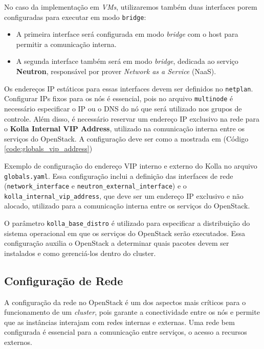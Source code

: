 No caso da implementação em \textit{VMs}, utilizaremos também duas interfaces porem configuradas para executar em modo \texttt{bridge}:
\begin{itemize}
    \item A primeira interface será configurada em modo \textit{bridge} com o host para permitir a comunicação interna.
    \item A segunda interface também será em modo \textit{bridge}, dedicada ao serviço \textbf{Neutron}, responsável por prover \textit{Network as a Service} (NaaS).
\end{itemize}

Os endereços IP estáticos para essas interfaces devem ser definidos no \texttt{netplan}. Configurar IPs fixos para os nós é essencial, pois no arquivo \texttt{multinode} é necessário especificar o IP ou o DNS do nó que será utilizado nos grupos de controle. Além disso, é necessário reservar um endereço IP exclusivo na rede para o \textbf{Kolla Internal VIP Address}, utilizado na comunicação interna entre os serviços do OpenStack. A configuração deve ser como a mostrada em (Código \ref{code:globals_vip_address})

\begin{listing}[h!]
    \noindent{}  
  \caption{Exemplo de configuração do endereço VIP interno e externo do Kolla no arquivo \texttt{globals.yaml}. Essa configuração inclui a definição das interfaces de rede (\texttt{network\_interface} e \texttt{neutron\_external\_interface}) e o \texttt{kolla\_internal\_vip\_address}, que deve ser um endereço IP exclusivo e não alocado, utilizado para a comunicação interna entre os serviços do OpenStack.}
  \label{code:globals_vip_address}
\end{listing}

O parâmetro \texttt{kolla\_base\_distro} é utilizado para especificar a distribuição do sistema operacional em que os serviços do OpenStack serão executados. Essa configuração auxilia o OpenStack a determinar quais pacotes devem ser instalados e como gerenciá-los dentro do cluster.

\subsection{Configuração de Rede}
A configuração da rede no OpenStack é um dos aspectos mais críticos para o funcionamento de um \textit{cluster}, pois garante a conectividade entre os nós e permite que as instâncias interajam com redes internas e externas. Uma rede bem configurada é essencial para a comunicação entre serviços, o acesso a recursos externos.

